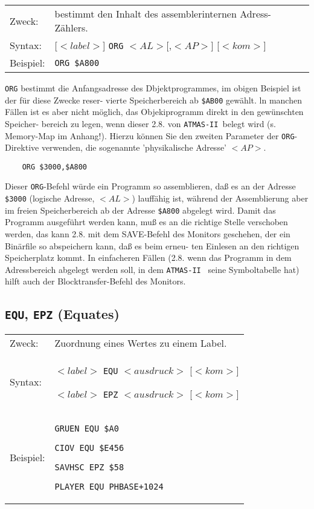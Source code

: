 \documentclass[10pt,a4paper,twoside,final,openright,titlepage]{memoir}
\newcommand{\foo}[1]{\ensuremath{< \!\! #1 \!\! >}}
\def\atmas{\texttt{AT\-MAS-II }}
\begin{document}
\newcommand{\directive}[3]{
\begin{tabular}{lp{25em}}
Zweck:		& #1 \\
Syntax:		& #2 \\
Beispiel:	& #3 \\
\end{tabular}
\bigskip
}

\directive{bestimmt den Inhalt des assemblerinternen Adress-Zählers.}
		  {[\foo{label}] \texttt{ORG} \foo{AL}[,\foo{AP}] [\foo{kom}]}
		  {\texttt{ORG \$A800}}

\texttt{ORG} bestimmt die Anfangsadresse des Dbjektprogrammes,
im obigen Beispiel ist der für diese Zwecke reser-
vierte Speicherbereich ab \texttt{\$AB00} gewählt.
ln manchen Fällen ist es aber nicht möglich, das
Objekiprogramm direkt in den gewünschten Speicher-
bereich zu legen, wenn dieser 2.8. von \atmas belegt
wird (s. Memory-Map im Anhang!). Hierzu können Sie
den zweiten Parameter der \texttt{ORG}-Direktive verwenden, die
sogenannte 'physikalische Adresse' \foo{AP}.

\begin{Verbatim}
	ORG $3000,$A800
\end{Verbatim}

Dieser \texttt{ORG}-Befehl würde ein Programm so assemblieren,
daß es an der Adresse \texttt{\$3000} (logische Adresse, \foo{AL})
lauffähig ist, während der Assemblierung aber im
freien Speicherbereich ab der Adresse \texttt{\$A800} abgelegt
wird. Damit das Programm ausgeführt werden kann, muß
es an die richtige Stelle verschoben werden, das kann
2.8. mit dem SAVE-Befehl des Monitors geschehen, der
ein Binärfile so abspeichern kann, daß es beim erneu-
ten Einlesen an den richtigen Speicherplatz kommt. In
einfacheren Fällen (2.8. wenn das Programm in dem
Adressbereich abgelegt werden soll, in dem \atmas
seine Symboltabelle hat) hilft auch der
Blocktransfer-Befehl des Monitors.

\subsection{\texttt{EQU}, \texttt{EPZ} (Equates)}

\directive{Zuordnung eines Wertes zu einem Label.}
		  {\foo{label} \texttt{EQU} \foo{ausdruck} [\foo{kom}] \par
		   \foo{label} \texttt{EPZ} \foo{ausdruck} [\foo{kom}]}
		  {
\texttt{GRUEN 	EQU \$A0 } \par
\texttt{CIOV 	EQU \$E456 } \par
\texttt{SAVHSC 	EPZ \$58 } \par
\texttt{PLAYER 	EQU PHBASE+1024 }
}
\end{document}
